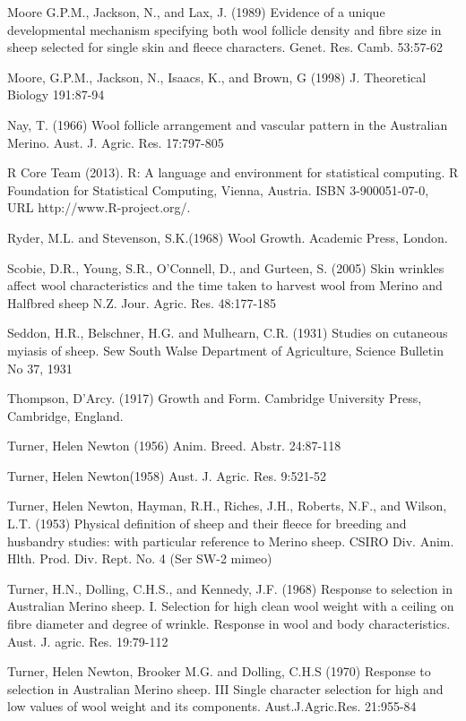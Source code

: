 \documentclass[titlepage]{article}  %
\begin{document}
\begin{thebibliography}{99}
Moore G.P.M., Jackson, N., and Lax, J. (1989) Evidence of a unique developmental mechanism specifying both wool follicle density and fibre size in sheep selected for single skin and fleece characters. Genet. Res. Camb. 53:57-62

Moore, G.P.M., Jackson, N., Isaacs, K., and Brown, G (1998) J. Theoretical Biology 191:87-94

Nay, T. (1966) Wool follicle arrangement and vascular pattern in the Australian Merino. Aust. J. Agric. Res. 17:797-805

R Core Team (2013). R: A language and environment for statistical
  computing. R Foundation for Statistical Computing, Vienna, Austria.
  ISBN 3-900051-07-0, URL http://www.R-project.org/.

Ryder, M.L. and Stevenson, S.K.(1968) Wool Growth. Academic Press, London.

Scobie, D.R., Young, S.R., O'Connell, D., and Gurteen, S. (2005) Skin wrinkles affect wool characteristics and the time taken to harvest wool from Merino and Halfbred sheep N.Z. Jour. Agric. Res. 48:177-185

Seddon, H.R., Belschner, H.G. and Mulhearn, C.R. (1931)  Studies on cutaneous myiasis of sheep. Sew South Walse Department of Agriculture, Science Bulletin No 37, 1931

Thompson, D'Arcy. (1917) Growth and Form. Cambridge University Press, Cambridge, England.

Turner, Helen Newton (1956) Anim. Breed. Abstr. 24:87-118

Turner, Helen Newton(1958) Aust. J. Agric. Res. 9:521-52

Turner, Helen Newton, Hayman, R.H., Riches, J.H., Roberts, N.F., and Wilson, L.T. (1953) Physical definition of sheep and their fleece for breeding and husbandry studies: with particular reference to Merino sheep. CSIRO Div. Anim. Hlth. Prod. Div. Rept. No. 4 (Ser SW-2 mimeo)

Turner, H.N., Dolling, C.H.S., and Kennedy, J.F. (1968) Response to selection in Australian Merino sheep. I. Selection for high clean wool weight with a ceiling on fibre diameter and degree of wrinkle. Response in wool and body characteristics. Aust. J. agric. Res. 19:79-112

Turner, Helen Newton, Brooker M.G. and Dolling, C.H.S (1970) Response to selection in Australian Merino sheep. III Single character selection for high and low values of wool weight and its components. Aust.J.Agric.Res. 21:955-84


\end{thebibliography}
\end{document}
